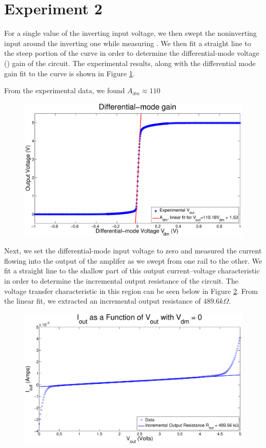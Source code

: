 \section*{Experiment 2}

For a single value of the inverting input voltage, we then swept the
noninverting input around the inverting one while measuring \Vout. We then fit
a straight line to the steep portion of the curve in order to determine the
differential-mode voltage (\Adm) gain of the circuit. The experimental results,
along with the differential mode gain fit to the curve is shown in Figure
\ref{fig:exp2p1}.

From the experimental data, we found $A_{dm} \approx 110$
\begin{figure}[H]
\centering
\includegraphics[width=\linewidth]{../Figures/Exp2P1.eps}
\caption{}
\label{fig:exp2p1}
\end{figure}

Next, we set the differential-mode input voltage to zero and measured the
current flowing into the output of the amplifer as we swept \Vout from one
rail to the other. We fit a straight line to the shallow part of this output
current–voltage characteristic in order to determine the incremental output
resistance of the circuit. The voltage transfer characteristic in this region
can be seen below in Figure \ref{fig:exp2p2}.
From the linear fit, we extracted an incremental output resistance of $489.6k\Omega$.

\begin{figure}[H]
\centering
\includegraphics[width=\linewidth]{../Figures/Exp2P2.eps}
\caption{}
\label{fig:exp2p2}
\end{figure}

